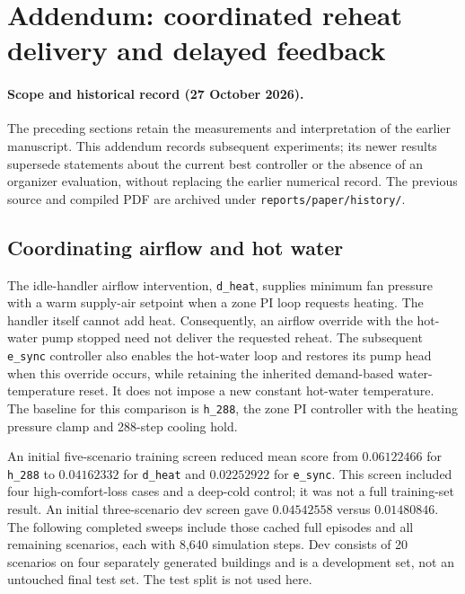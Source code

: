 \section{Addendum: coordinated reheat delivery and delayed feedback}
\label{sec:oct27update}

\paragraph{Scope and historical record (27 October 2026).}
The preceding sections retain the measurements and interpretation of the
earlier manuscript. This addendum records subsequent experiments; its newer
results supersede statements about the current best controller or the absence
of an organizer evaluation, without replacing the earlier numerical record.
The previous source and compiled PDF are archived under
\texttt{reports/paper/history/}.

\subsection{Coordinating airflow and hot water}
The idle-handler airflow intervention, \texttt{d\_heat}, supplies minimum
fan pressure with a warm supply-air setpoint when a zone PI loop requests
heating. The handler itself cannot add heat. Consequently, an airflow override
with the hot-water pump stopped need not deliver the requested reheat.
The subsequent \texttt{e\_sync} controller also enables the hot-water loop
and restores its pump head when this override occurs, while retaining the
inherited demand-based water-temperature reset. It does not impose a new
constant hot-water temperature. The baseline for this comparison is
\texttt{h\_288}, the zone PI controller with the heating pressure clamp and
288-step cooling hold.

An initial five-scenario training screen reduced mean score from
$0.06122466$ for \texttt{h\_288} to $0.04162332$ for \texttt{d\_heat}
and $0.02252922$ for \texttt{e\_sync}. This screen included four high-comfort-loss
cases and a deep-cold control; it was not a full training-set result.
An initial three-scenario dev screen gave $0.04542558$ versus $0.01480846$.
The following completed sweeps include those cached full episodes and all
remaining scenarios, each with 8,640 simulation steps. Dev consists of
20 scenarios on four separately generated buildings and is a development
set, not an untouched final test set. The test split is not used here.

